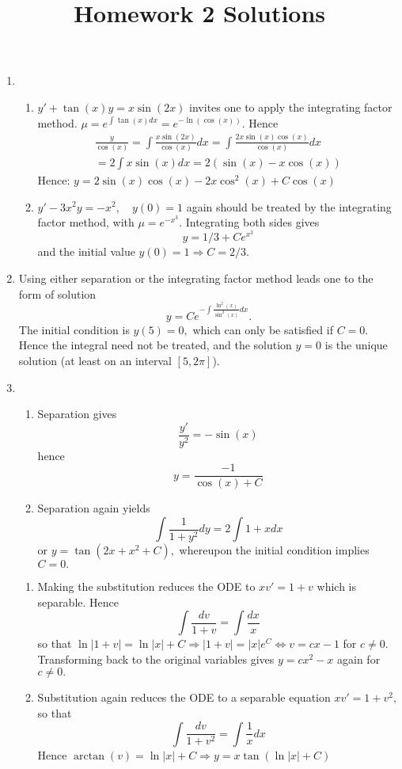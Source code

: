 \documentclass[10pt,a4paper]{article}
\title{Homework 2 Solutions}
\date{}
\begin{document}
\maketitle
\begin{enumerate}
\item
\begin{enumerate}
\item $ y' + \tan(x) y = x \sin(2x)$ invites one to apply the integrating factor method. $\mu = e^{\int \tan(x) dx} = e^{-\ln(\cos(x))}.$ Hence
\begin{align*}
\frac{y}{\cos(x)} = \int \frac{x \sin(2x)}{\cos(x)} dx = \int \frac{2x \sin(x) \cos(x)}{\cos(x)} dx \\
= 2 \int x \sin(x) dx = 2(\sin(x) - x\cos(x))
\end{align*}
Hence: $y = 2 \sin(x) \cos(x) - 2x\cos^2(x) + C \cos(x)$
\item $y' - 3x^2 y = -x^2, \quad y(0) = 1$ again should be treated by the integrating factor method, with $\mu = e^{-x^3}.$ Integrating both sides gives
\[ y = 1/3 + Ce^{x^3} \]
and the initial value $y(0) = 1 \Rightarrow C = 2/3.$
\end{enumerate}
\item Using either separation or the integrating factor method leads one to the form of solution
\[ y = C e^{-\int \frac{\ln^2(x)}{\sin^2(x)} dx}. \]
The initial condition is $y(5) = 0,$ which can only be satisfied if $C=0.$ Hence the integral need not be treated, and the solution $y = 0$ is the unique solution (at least on an interval $[5,2\pi]$).
\item \begin{enumerate}
\item Separation gives
\[ \frac{y'}{y^2} = -\sin(x) \] 
hence 
\[ y = \frac{-1}{\cos(x) + C} \]
\item Separation again yields
\[ \int \frac{1}{1+y^2} dy = 2 \int 1+ x dx \]
or $y = \tan(2x+x^2 + C),$ whereupon the initial condition implies $C = 0.$
\end{enumerate}
\begin{enumerate}
\item Making the substitution reduces the ODE to $xv' = 1+v$ which is separable. Hence
\[ \int \frac{dv}{1+v} = \int \frac{dx}{x} \]
so that $\ln|1+v| = \ln|x| + C \Rightarrow |1+v| = |x|e^C \Leftrightarrow v=cx -1$ for $c \neq 0.$ Transforming back to the original variables gives $y = cx^2 - x$ again for $c \neq 0.$
\item Substitution again reduces the ODE to a separable equation $xv' = 1+v^2,$ so that 
\[ \int \frac{dv}{1+v^2} = \int \frac{1}{x} dx \]
Hence $\arctan(v) = \ln|x| + C \Rightarrow y = x \tan(\ln|x| + C)$
\end{enumerate}
\end{enumerate}
\end{document}
